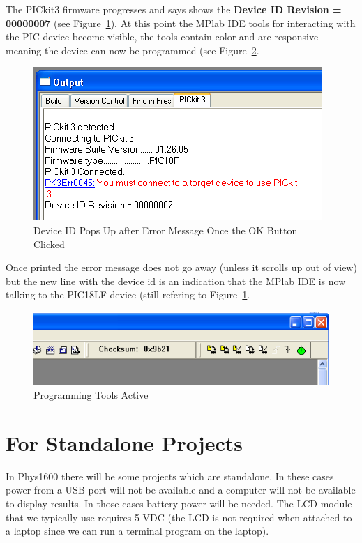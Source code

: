 \documentclass[twocolumn]{article}
\makeatletter
\def\maxwidth{\ifdim\Gin@nat@width>\linewidth\linewidth
\else\Gin@nat@width\fi}
\let\Oldincludegraphics\includegraphics
\renewcommand{\includegraphics}[1]{\Oldincludegraphics[width=\maxwidth]{#1}}
\makeatother
\begin{document}
The PICkit3 firmware progresses and says shows the \textbf{Device ID
Revision = 00000007} (see Figure~\ref{deviceid}). At this point the MPlab IDE tools for interacting
with the PIC device become visible, the tools contain color and are responsive meaning
the device can now be programmed (see Figure~\ref{programmingtools}.

\begin{figure}[htbp]
\centering
\includegraphics{phys1600/device_id.png}
\caption{Device ID Pops Up after Error Message Once the OK Button Clicked}
\label{deviceid}
\end{figure}

Once printed the error message does not go away (unless it scrolls up
out of view) but the new line with the device id is an indication that
the MPlab IDE is now talking to the PIC18LF device (still refering to Figure~\ref{deviceid}.

\begin{figure}[htbp]
\centering
\includegraphics{phys1600/programming_tools.png}
\caption{Programming Tools Active}
\label{programmingtools}
\end{figure}

\section{For Standalone Projects}

In Phys1600 there will be some projects which are standalone. In these
cases power from a USB port will not be available and a computer will
not be available to display results. In those cases battery power will
be needed. The LCD module that we typically use requires 5 VDC (the LCD
is not required when attached to a laptop since we can run a terminal
program on the laptop).
\end{document}
